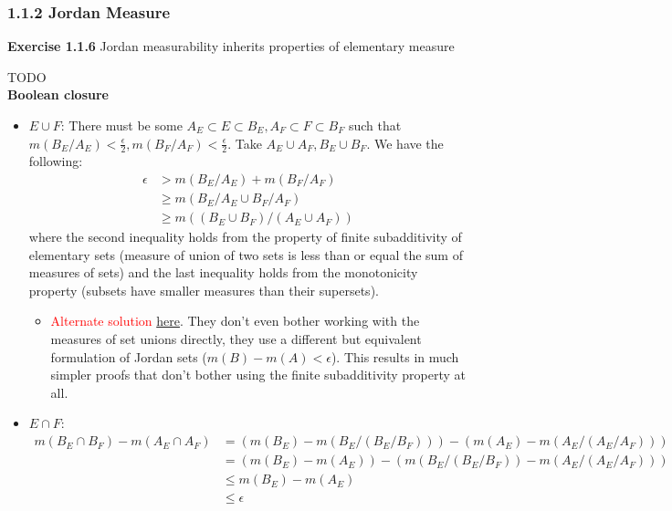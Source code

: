 \documentclass[answers,12pt]{exam}
\begin{document}
\subsubsection{1.1.2 Jordan Measure}

\textbf{Exercise 1.1.6} Jordan measurability inherits properties of elementary measure
\begin{solution} TODO\\
\textbf{Boolean closure}
\begin{itemize}
    \item $E \cup F$: There must be some $A_E \subset E \subset B_E, A_F \subset F \subset B_F$ such that $m(B_E/A_E) < \frac{\epsilon}{2}, m(B_F/A_F)<\frac{\epsilon}{2}$. 
    Take $A_E \cup A_F, B_E \cup B_F$.
    We have the following:
    \[
        \begin{aligned}
            \epsilon &> m(B_E/A_E) + m(B_F/A_F)\\
            &\geq m(B_E/A_E \cup B_F/A_F) \\
            &\geq m((B_E \cup B_F)/(A_E \cup A_F))
        \end{aligned}
    \]
    where the second inequality holds from the property of finite subadditivity of elementary sets (measure of union of two sets is less than or equal the sum of measures of sets)
    and the last inequality holds from the monotonicity property (subsets have smaller measures than their supersets).
    \begin{itemize}
        \item \textcolor{red}{Alternate solution} \href{https://math.solverer.com/library/terence_tao/an_introduction_to_measure_theory/exercise_1-1-6}{here}. 
        They don't even bother working with the measures of set unions directly, they use a different but equivalent formulation of Jordan sets ($m(B)-m(A) < \epsilon$). 
        This results in much simpler proofs that don't bother using the finite subadditivity property at all.
    \end{itemize}
    \item $E \cap F$:
    \[
        \begin{aligned}
            m(B_E \cap B_F) - m(A_E \cap A_F) &= 
            (m(B_E)-m(B_E/(B_E/B_F))) - (m(A_E)-m(A_E/(A_E/A_F))) \\
            &= (m(B_E)-m(A_E)) - (m(B_E/(B_E/B_F)) - m(A_E/(A_E/A_F))) \\
            &\leq m(B_E)-m(A_E) \\
            &\leq \epsilon
        \end{aligned}
\]
\end{itemize}
\end{solution}
\end{document}
